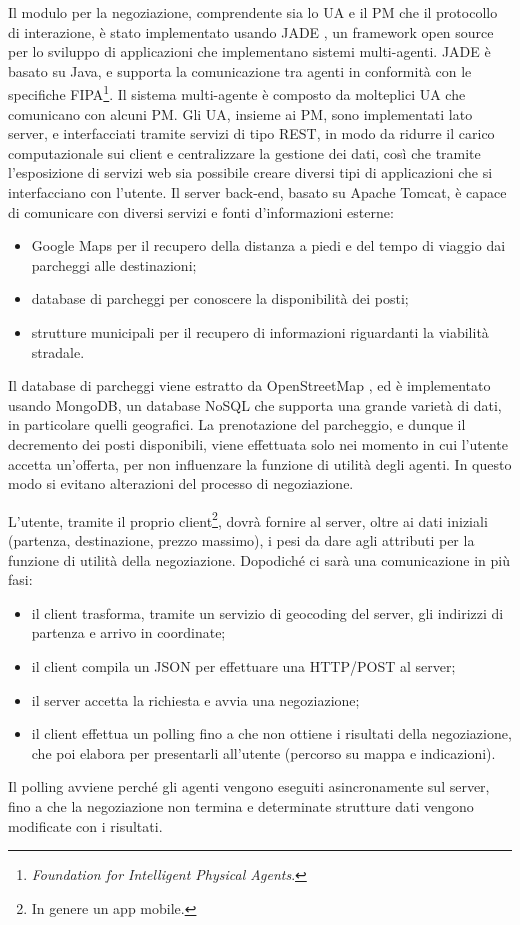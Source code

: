 \documentclass[11pt,a4paper,twoside]{article}
\numberwithin{figure}{section}
\numberwithin{equation}{section}
\begin{document}
Il modulo per la negoziazione, comprendente sia lo UA e il PM che il protocollo di interazione, è stato implementato usando JADE \cite{11}, un framework open source per lo sviluppo di applicazioni che implementano sistemi multi-agenti. JADE è basato su Java, e supporta la comunicazione tra agenti in conformità con le specifiche FIPA\footnote{\emph{Foundation for Intelligent Physical Agents}.}. Il sistema multi-agente è composto da molteplici UA che comunicano con alcuni PM. Gli UA, insieme ai PM, sono implementati lato server, e interfacciati tramite servizi di tipo REST, in modo da ridurre il carico computazionale sui client e centralizzare la gestione dei dati, così che tramite l'esposizione di servizi web sia possibile creare diversi tipi di applicazioni che si interfacciano con l'utente. Il server back-end, basato su Apache Tomcat, è capace di comunicare con diversi servizi e fonti d'informazioni esterne:
\begin{itemize}
    \item Google Maps \cite{12} per il recupero della distanza a piedi e del tempo di viaggio dai parcheggi alle destinazioni;
    \item database di parcheggi per conoscere la disponibilità dei posti;
    \item strutture municipali per il recupero di informazioni riguardanti la viabilità stradale.
\end{itemize}
Il database di parcheggi viene estratto da OpenStreetMap \cite{13}, ed è implementato usando MongoDB, un database NoSQL che supporta una grande varietà di dati, in particolare quelli geografici.
La prenotazione del parcheggio, e dunque il decremento dei posti disponibili, viene effettuata solo nei momento in cui l'utente accetta un'offerta, per non influenzare la funzione di utilità degli agenti. In questo modo si evitano alterazioni del processo di negoziazione.

L'utente, tramite il proprio client\footnote{In genere un app mobile.}, dovrà fornire al server, oltre ai dati iniziali (partenza, destinazione, prezzo massimo), i pesi da dare agli attributi per la funzione di utilità della negoziazione.
Dopodiché ci sarà una comunicazione in più fasi:
\begin{itemize}
    \item il client trasforma, tramite un servizio di geocoding del server, gli indirizzi di partenza e arrivo in coordinate;
    \item il client compila un JSON per effettuare una HTTP/POST al server;
    \item il server accetta la richiesta e avvia una negoziazione;
    \item il client effettua un polling fino a che non ottiene i risultati della negoziazione, che poi elabora per presentarli all'utente (percorso su mappa e indicazioni).
\end{itemize}
Il polling avviene perché gli agenti vengono eseguiti asincronamente sul server, fino a che la negoziazione non termina e determinate strutture dati vengono modificate con i risultati.
\end{document}
